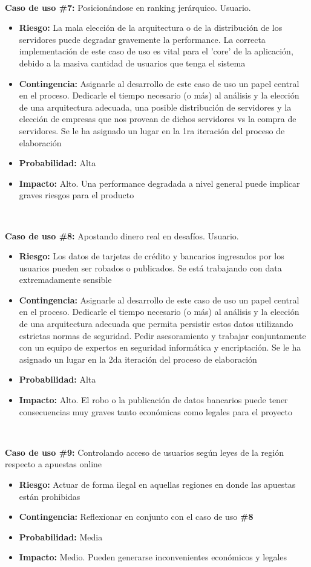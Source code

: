 ~

\textbf{Caso de uso \#7:} Posicionándose en ranking jerárquico. Usuario.
\begin{itemize}
\item{\textbf{Riesgo:} La mala elección de la arquitectura o de la distribución de los servidores puede degradar gravemente la performance. La correcta implementación de este caso de uso es vital para el 'core' de la aplicación, debido a la masiva cantidad de usuarios que tenga el sistema}
\item{\textbf{Contingencia:} Asignarle al desarrollo de este caso de uso un papel central en el proceso. Dedicarle el tiempo necesario (o más) al análisis y la elección 
de una arquitectura adecuada, una posible distribución de servidores y la elección de empresas que nos provean de dichos servidores vs la compra de servidores. Se le ha asignado
un lugar en la 1ra iteración del proceso de elaboración}
\item{\textbf{Probabilidad:} Alta}
\item{\textbf{Impacto:} Alto. Una performance degradada a nivel general puede implicar graves riesgos para el producto}
\end{itemize}

~

\textbf{Caso de uso \#8:} Apostando dinero real en desafíos. Usuario.
\begin{itemize}
\item{\textbf{Riesgo:} Los datos de tarjetas de crédito y bancarios ingresados por los usuarios pueden ser robados o publicados. Se está trabajando con data extremadamente
sensible}
\item{\textbf{Contingencia:} Asignarle al desarrollo de este caso de uso un papel central en el proceso. Dedicarle el tiempo necesario (o más) al análisis y la elección 
de una arquitectura adecuada que permita persistir estos datos utilizando estrictas normas de seguridad. Pedir asesoramiento y trabajar conjuntamente con un equipo de expertos en seguridad informática y encriptación. Se le ha asignado un lugar en la 2da iteración del proceso de elaboración}
\item{\textbf{Probabilidad:} Alta}
\item{\textbf{Impacto:} Alto. El robo o la publicación de datos bancarios puede tener consecuencias muy graves tanto económicas como legales para el proyecto}
\end{itemize}

~

\textbf{Caso de uso \#9:} Controlando acceso de usuarios según leyes de la región respecto a apuestas online
\begin{itemize}
\item{\textbf{Riesgo:} Actuar de forma ilegal en aquellas regiones en donde las apuestas están prohibidas}
\item{\textbf{Contingencia:} Reflexionar en conjunto con el caso de uso \textbf{\#8}} 
\item{\textbf{Probabilidad:} Media}
\item{\textbf{Impacto:} Medio. Pueden generarse inconvenientes económicos y legales}
\end{itemize}

